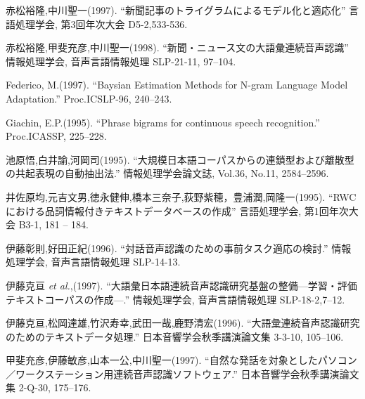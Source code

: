 \begin{thebibliography}{99}

    赤松裕隆,中川聖一(1997).
    ``新聞記事のトライグラムによるモデル化と適応化''
    言語処理学会, 第3回年次大会 D5-2,533-536.

    赤松裕隆,甲斐充彦,中川聖一(1998).
    ``新聞・ニュース文の大語彙連続音声認識''
    情報処理学会, 音声言語情報処理 SLP-21-11, 97--104.

    Federico, M.(1997).
    ``Baysian Estimation Methods for N-gram Language Model Adaptation.''
    Proc.ICSLP-96, 240--243.

    Giachin, E.P.(1995).
    ``Phrase bigrams for continuous speech recognition.''
    Proc.ICASSP, 225--228.

    池原悟,白井諭,河岡司(1995).
    ``大規模日本語コーパスからの連鎖型および離散型の共起表現の自動抽出法.''
    情報処理学会論文誌, Vol.36, No.11, 2584--2596.

    井佐原均,元吉文男,徳永健伸,橋本三奈子,荻野紫穂，豊浦潤,岡隆一(1995).
    ``RWCにおける品詞情報付きテキストデータベースの作成''
    言語処理学会, 第1回年次大会 B3-1, 181 -- 184.

    伊藤彰則,好田正紀(1996).
    ``対話音声認識のための事前タスク適応の検討.''
    情報処理学会, 音声言語情報処理 SLP-14-13.

    伊藤克亘 {\em et al.},(1997). 
    ``大語彙日本語連続音声認識研究基盤の整備---学習・評価テキストコーパスの作成---.''
    情報処理学会, 音声言語情報処理 SLP-18-2,7--12.
 
    伊藤克亘,松岡達雄,竹沢寿幸,武田一哉,鹿野清宏(1996).
    ``大語彙連続音声認識研究のためのテキストデータ処理.''
    日本音響学会秋季講演論文集 3-3-10, 105--106.

    甲斐充彦,伊藤敏彦,山本一公,中川聖一(1997).
    ``自然な発話を対象としたパソコン／ワークステーション用連続音声認識ソフトウェア.''
日本音響学会秋季講演論文集 2-Q-30, 175--176.



\end{thebibliography}
